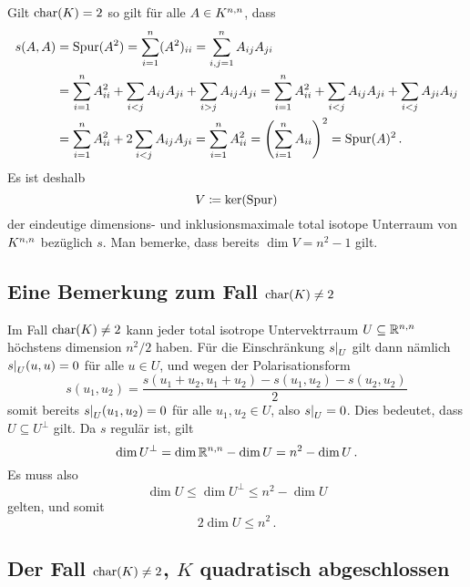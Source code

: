 Gilt $\ringchar(K) = 2$ so gilt für alle $A \in \matrices{n}{K}$, dass
\begin{align*}
      s(A,A)
  &=  \tr(A^2)
   =  \sum_{i=1}^n (A^2)_{ii}
   =  \sum_{i,j=1}^n A_{ij} A_{ji}
  \\
  &=    \sum_{i=1}^n A_{ii}^2
      + \sum_{i < j} A_{ij} A_{ji}
      + \sum_{i > j} A_{ij} A_{ji}
   =    \sum_{i=1}^n A_{ii}^2
      + \sum_{i < j} A_{ij} A_{ji}
      + \sum_{i < j} A_{ji} A_{ij}
  \\
  &=    \sum_{i=1}^n A_{ii}^2
      + 2\sum_{i < j} A_{ij} A_{ji}
   =  \sum_{i=1}^n A_{ii}^2
   =  \left( \sum_{i=1}^n A_{ii} \right)^2
   =  \tr(A)^2 \,.
\end{align*}
Es ist deshalb
\[
            V
  \defined  \ker(\tr)
\]
der eindeutige dimensions- und inklusionsmaximale total isotope Unterraum von $\matrices{n}{K}$ bezüglich $s$.
Man bemerke, dass bereits $\dim V = n^2 - 1$ gilt.





\subsection*{Eine Bemerkung zum Fall $\ringchar(K) \neq 2$}

Im Fall $\ringchar(K) \neq 2$ kann jeder total isotrope Untervektrraum $U \subseteq \matrices{n}{\Real}$ höchstens dimension $n^2/2$ haben.
Für die Einschränkung $\restrict{s}{U}$ gilt dann nämlich $\restrict{s}{U}(u,u) = 0$ für alle $u \in U$, und wegen der Polarisationsform
\[
    s(u_1, u_2)
  = \frac{s(u_1 + u_2, u_1 + u_2) - s(u_1, u_2) - s(u_2,u_2)}{2}
\]
somit bereits $\restrict{s}{U}(u_1, u_2) = 0$ für alle $u_1, u_2 \in U$, also $\restrict{s}{U} = 0$.
Dies bedeutet, dass $U \subseteq U^\perp$ gilt.
Da $s$ regulär ist, gilt
\[
    \dim U^\perp
  = \dim \matrices{n}{\Real} - \dim U
  = n^2 - \dim U \,.
\]
Es muss also
\[
        \dim U
  \leq  \dim U^\perp
  \leq  n^2 - \dim U
\]
gelten, und somit
\[
        2 \dim U
  \leq  n^2 \,.
\]


\subsection*{Der Fall $\ringchar(K) \neq 2$, $K$ quadratisch abgeschlossen}

